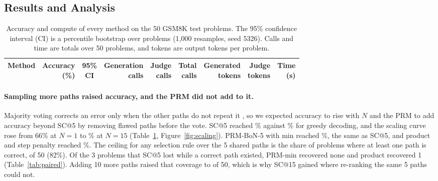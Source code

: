 \documentclass{article}
\begin{document}
\subsection{Results and Analysis}

\begin{table}[t]
  \centering
  \footnotesize
  \caption{Accuracy and compute of every method on the 50 GSM8K test problems. The 95\% confidence interval (CI) is a percentile bootstrap over problems (1{,}000 resamples, seed 5326). Calls and time are totals over 50 problems, and tokens are output tokens per problem.}
  \label{tab:results}
  \setlength{\tabcolsep}{3.5pt}
  \begin{tabular}{lrcrrrrrr}
    \toprule
    Method & \shortstack{Accuracy\\(\%)} & \shortstack{95\%\\CI} & \shortstack{Generation\\calls} & \shortstack{Judge\\calls} & \shortstack{Total\\calls} & \shortstack{Generated\\tokens} & \shortstack{Judge\\tokens} & \shortstack{Time\\(s)} \\
    \midrule
    
  \end{tabular}
\end{table}

\paragraph{Sampling more paths raised accuracy, and the PRM did not add to it.} Majority voting corrects an error only when the other paths do not repeat it \citep{wang2023selfconsistencyimproveschainthought}, so we expected accuracy to rise with $N$ and the PRM to add accuracy beyond SC@5 by removing flawed paths before the vote. SC@5 reached \accSCfive\% against \accGreedy\% for greedy decoding, and the scaling curve rose from 66\% at $N=1$ to \accSCfifteen\% at $N=15$ (Table~\ref{tab:results}, Figure~\ref{fig:scaling}). PRM-BoN-5 with min reached \accPRMmin\%, the same as SC@5, and product and step penalty reached \accPRMprod\%. The ceiling for any selection rule over the 5 shared paths is the share of problems where at least one path is correct, \coverFive{} of 50 (82\%). Of the 3 problems that SC@5 lost while a correct path existed, PRM-min recovered none and product recovered 1 (Table~\ref{tab:paired}). Adding 10 more paths raised that coverage to \coverFifteen{} of 50, which is why SC@15 gained where re-ranking the same 5 paths could not.
\end{document}
